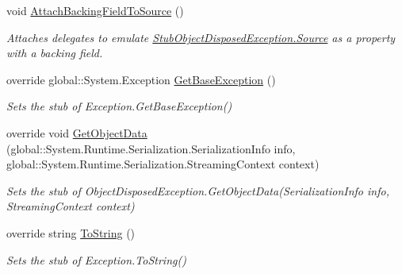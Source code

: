 \begin{DoxyCompactItemize}
void \hyperlink{class_system_1_1_fakes_1_1_stub_object_disposed_exception_ac8aba3dd1cf566e83789806d636680a4}{Attach\-Backing\-Field\-To\-Source} ()
\begin{DoxyCompactList}\small\item\em Attaches delegates to emulate \hyperlink{class_system_1_1_fakes_1_1_stub_object_disposed_exception_a0deeb7d924fa86b7b2199df7bcdaeb90}{Stub\-Object\-Disposed\-Exception.\-Source} as a property with a backing field.\end{DoxyCompactList}\item 
override global\-::\-System.\-Exception \hyperlink{class_system_1_1_fakes_1_1_stub_object_disposed_exception_acd60495aabfda6bd292dbf4b3e96c83b}{Get\-Base\-Exception} ()
\begin{DoxyCompactList}\small\item\em Sets the stub of Exception.\-Get\-Base\-Exception()\end{DoxyCompactList}\item 
override void \hyperlink{class_system_1_1_fakes_1_1_stub_object_disposed_exception_ad844377326ad0cbc6d8ab2a4beabc1c1}{Get\-Object\-Data} (global\-::\-System.\-Runtime.\-Serialization.\-Serialization\-Info info, global\-::\-System.\-Runtime.\-Serialization.\-Streaming\-Context context)
\begin{DoxyCompactList}\small\item\em Sets the stub of Object\-Disposed\-Exception.\-Get\-Object\-Data(\-Serialization\-Info info, Streaming\-Context context)\end{DoxyCompactList}\item 
override string \hyperlink{class_system_1_1_fakes_1_1_stub_object_disposed_exception_aae9386cc63599700b9dd960fa67220fd}{To\-String} ()
\begin{DoxyCompactList}\small\item\em Sets the stub of Exception.\-To\-String()\end{DoxyCompactList}\end{DoxyCompactItemize}
